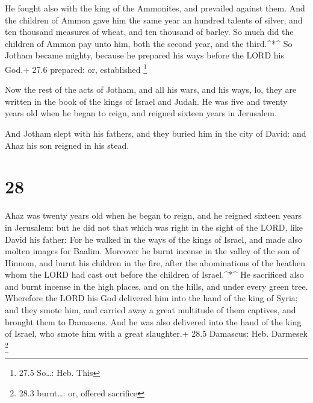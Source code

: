  He fought also with the king of the Ammonites, and
prevailed against them. And the children of Ammon gave him the same year
an hundred talents of silver, and ten thousand measures of wheat, and
ten thousand of barley. So much did the children of Ammon pay unto him,
both the second year, and the third.\^{}*\^{}  So Jotham
became mighty, because he prepared his ways before the LORD his God.+
27.6 prepared: or, established \footnote{27.5 So\ldots: Heb. This}

 Now the rest of the acts of Jotham, and all his wars, and
his ways, lo, they are written in the book of the kings of Israel and
Judah.  He was five and twenty years old when he began to
reign, and reigned sixteen years in Jerusalem.

 And Jotham slept with his fathers, and they buried him in
the city of David: and Ahaz his son reigned in his stead.

\hypertarget{section-27}{%
\section{28}\label{section-27}}

 Ahaz was twenty years old when he began to reign, and he
reigned sixteen years in Jerusalem: but he did not that which was right
in the sight of the LORD, like David his father:  For he
walked in the ways of the kings of Israel, and made also molten images
for Baalim.  Moreover he burnt incense in the valley of the
son of Hinnom, and burnt his children in the fire, after the
abominations of the heathen whom the LORD had cast out before the
children of Israel.\^{}*\^{}  He sacrificed also and burnt
incense in the high places, and on the hills, and under every green
tree.  Wherefore the LORD his God delivered him into the
hand of the king of Syria; and they smote him, and carried away a great
multitude of them captives, and brought them to Damascus. And he was
also delivered into the hand of the king of Israel, who smote him with a
great slaughter.+ 28.5 Damascus: Heb. Darmesek \footnote{28.3
  burnt\ldots: or, offered sacrifice}

